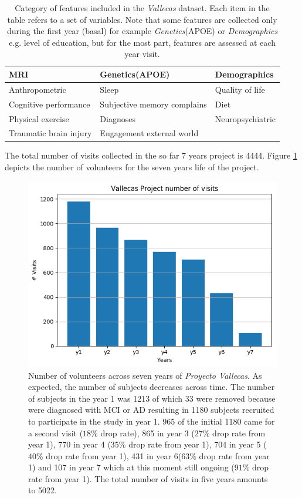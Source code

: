 \documentclass[11pt]{article}
\theoremstyle{definition}
\theoremstyle{remark}
\begin{document}
\begin{table}
\begin{tabular}{ |p{4.4cm}|p{4.4cm}|p{4.4cm}| }
\hline
\hline
MRI & Genetics(APOE) & Demographics  \\
\hline
Anthropometric & Sleep & Quality of life \\
\hline
Cognitive performance & Subjective memory complains & Diet \\
\hline
Physical exercise & Diagnoses & Neuropsychiatric \\
\hline
Traumatic brain injury & Engagement external world &  \\
\hline

\hline
\end{tabular}
\caption{Category of features included in the \emph{Vallecas} dataset. Each item in the table refers to a set of variables. Note that some features are collected only during the first year (basal) for example \emph{Genetics}(APOE) or \emph{Demographics} e.g. level of education, but for the most part, features are assessed at each year visit.}
\label{tab:vallecasvars}
\end{table}

The total number of visits collected in the so far 7 years project is 4444. Figure \ref{fig:pv5years} depicts the number of volunteers for the seven years life of the project.

\begin{figure}[H]
        \centering
        \includegraphics[keepaspectratio, width=0.6\linewidth]{figures/Fig_visits}
        \caption{Number of volunteers across seven years of \emph{Proyecto Vallecas}. As expected, the number of subjects decreases across time. The number of subjects in the year 1 was 1213 of which 33 were removed because were diagnosed with MCI or AD resulting in 1180 subjects recruited to participate in the study in year 1. 965 of the initial 1180 came for a second visit ($18\%$ drop rate), 865 in year 3 ($27\%$ drop rate from year 1), 770 in year 4 ($35\%$ drop rate from year 1), 704 in year 5 ($40\%$ drop rate from year 1), 431 in year 6($63\%$ drop rate from year 1) and 107 in year 7 which at this moment still ongoing ($91\%$ drop rate from year 1). The total number of visits in five years amounts to 5022.} \label{fig:pv5years}
\end{figure}
\end{document}

